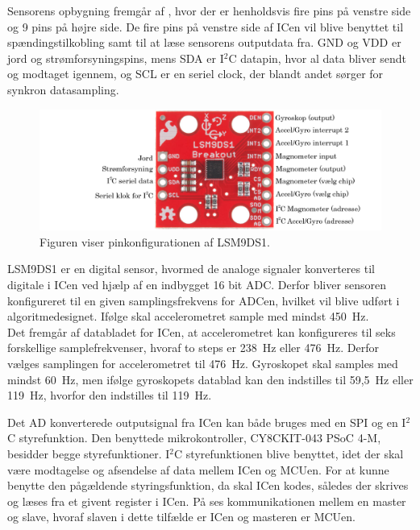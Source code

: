 Sensorens opbygning fremgår af , hvor der er henholdsvis fire pins på venstre side og 9 pins på højre side. De fire pins på venstre side af ICen vil blive benyttet til spændingstilkobling samt til at læse sensorens outputdata fra. GND og VDD er jord og strømforsyningspins, mens SDA er I$^2$C datapin, hvor al data bliver sendt og modtaget igennem, og SCL er en seriel clock, der blandt andet sørger for synkron datasampling.
\begin{figure}[H]
	\centering
	\includegraphics[scale=0.2]{figures/cDesign/accelerometeret.png}
	\caption{Figuren viser pinkonfigurationen af LSM9DS1. \citep{Jimb02016}}
	\label{fig:IC_pins}
\end{figure}

LSM9DS1 er en digital sensor, hvormed de analoge signaler konverteres til digitale i ICen ved hjælp af en indbygget 16 bit ADC. Derfor bliver sensoren konfigureret til en given samplingsfrekvens for ADCen, hvilket vil blive udført i algoritmedesignet. Ifølge  skal accelerometret sample med mindst 450~Hz.\\
Det fremgår af databladet for ICen, at accelerometret kan konfigureres til seks forskellige samplefrekvenser, hvoraf to steps er 238~Hz eller 476~Hz. Derfor vælges samplingen for accelerometret til 476~Hz. Gyroskopet skal samples med mindst 60~Hz, men ifølge gyroskopets datablad kan den indstilles til 59,5~Hz eller 119~Hz, hvorfor den indstilles til 119~Hz.

Det AD konverterede outputsignal fra ICen kan både bruges med en SPI og en I$^{2}$C styrefunktion. Den benyttede mikrokontroller, CY8CKIT-043 PSoC 4-M, besidder begge styrefunktioner. I$^{2}$C styrefunktionen blive benyttet, idet der skal være modtagelse og afsendelse af data mellem ICen og MCUen. For at kunne benytte den pågældende styringsfunktion, da skal ICen kodes, således der skrives og læses fra et givent register i ICen. På  ses kommunikationen mellem en master og slave, hvoraf slaven i dette tilfælde er ICen og masteren er MCUen. 


